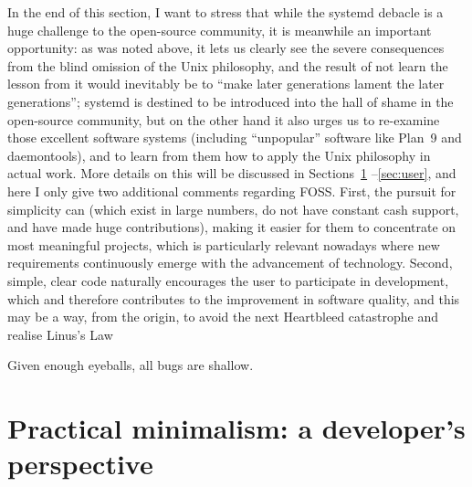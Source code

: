 In the end of this section, I want to stress that while the systemd debacle
is a huge challenge to the open-source community, it is meanwhile an important
opportunity: as was noted above, it lets us clearly see the severe consequences
from the blind omission of the Unix philosophy, and the result of not learn the
lesson from it would inevitably be to ``make later generations lament the later
generations''; systemd is destined to be introduced into the hall of shame in
the open-source community, but on the other hand it also urges us to re-examine
those excellent software systems (including ``unpopular'' software like Plan~9
and daemontools), and to learn from them how to apply the Unix philosophy in
actual work.  More details on this will be discussed in Sections~\ref{sec:devel}%
--\ref{sec:user}, and here I only give two additional comments regarding
FOSS.  First, the pursuit for simplicity can  (which exist in large numbers, do not have constant cash support,
and have made huge contributions), making it easier for them to concentrate
on most meaningful projects, which is particularly relevant nowadays where
new requirements continuously emerge with the advancement of technology.
Second, simple, clear code naturally encourages the user to participate
in development, which 
and therefore contributes to the improvement in software quality,
and this may be a way, from the origin, to avoid the next Heartbleed
catastrophe and realise Linus's Law
\begin{quoting}
	Given enough eyeballs, all bugs are shallow.
\end{quoting}

\section{Practical minimalism: a developer's perspective}\label{sec:devel}

